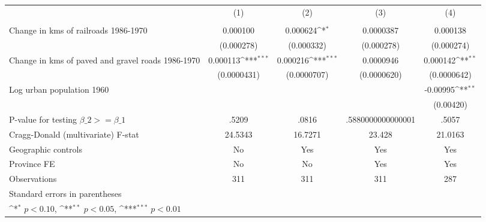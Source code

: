 {
\def\sym#1{\ifmmode^{#1}\else\(^{#1}\)\fi}
\begin{tabular}{l*{4}{c}}
\hline\hline
                &\multicolumn{1}{c}{(1)}&\multicolumn{1}{c}{(2)}&\multicolumn{1}{c}{(3)}&\multicolumn{1}{c}{(4)}\\
                &\multicolumn{1}{c}{}&\multicolumn{1}{c}{}&\multicolumn{1}{c}{}&\multicolumn{1}{c}{}\\
\hline
Change in kms of railroads 1986-1970& 0.000100         & 0.000624\sym{*}  &0.0000387         & 0.000138         \\
                &(0.000278)         &(0.000332)         &(0.000278)         &(0.000274)         \\
[1em]
Change in kms of paved and gravel roads 1986-1970& 0.000113\sym{***}& 0.000216\sym{***}&0.0000946         & 0.000142\sym{**} \\
                &(0.0000431)         &(0.0000707)         &(0.0000620)         &(0.0000642)         \\
[1em]
Log urban population 1960&                  &                  &                  & -0.00995\sym{**} \\
                &                  &                  &                  &(0.00420)         \\
\hline
P-value for testing $\beta\_{2} >= \beta\_{1}$&    .5209         &    .0816         &.5880000000000001         &    .5057         \\
Cragg-Donald (multivariate) F-stat&  24.5343         &  16.7271         &   23.428         &  21.0163         \\
Geographic controls&       No         &      Yes         &      Yes         &      Yes         \\
Province FE     &       No         &       No         &      Yes         &      Yes         \\
Observations    &      311         &      311         &      311         &      287         \\
\hline\hline
\multicolumn{5}{l}{\footnotesize Standard errors in parentheses}\\
\multicolumn{5}{l}{\footnotesize \sym{*} \(p<0.10\), \sym{**} \(p<0.05\), \sym{***} \(p<0.01\)}\\
\end{tabular}
}
